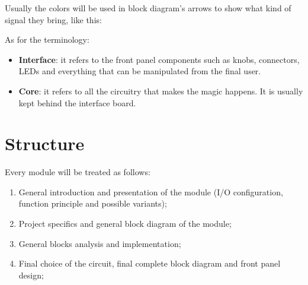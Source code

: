 Usually the colors will be used in block diagram's arrows to show what kind of signal they
bring, like this:


As for the terminology:

\begin{itemize}
      \item
            \textbf{Interface}: it refers to the front panel components such as knobs,
            connectors, LEDs and everything that can be manipulated from the final user.
      \item
            \textbf{Core}: it refers to all the circuitry that makes the magic happens. It
            is usually kept behind the interface board.
\end{itemize}


\section*{Structure}

Every module will be treated as follows:

\begin{enumerate}
      \item
            General introduction and presentation of the module (I/O configuration,
            function principle and possible variants);
      \item
            Project specifics and general block diagram of the module;
      \item
            General blocks analysis and implementation;
      \item
            Final choice of the circuit, final complete block diagram and front panel design;
\end{enumerate}
